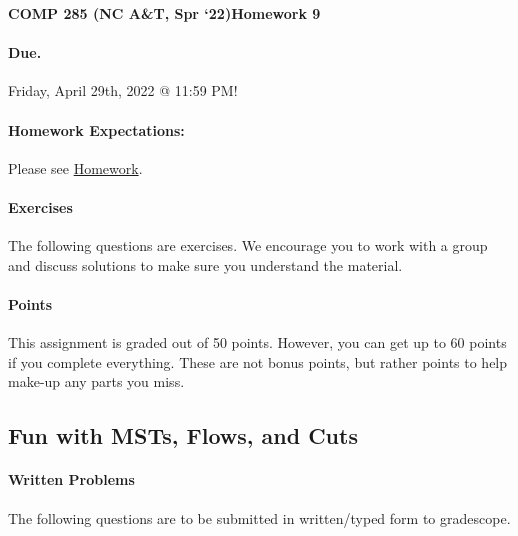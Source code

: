 \documentclass [12pt]{article}
\begin{document}
 

{\LARGE \textbf{COMP 285 (NC A\&T, Spr `22)}\hfill \textbf{Homework 9} } 
\vspace{1em} 
\begin{Instruction} 

\paragraph{Due.} Friday, April 29th, 2022 @ 11:59 PM!
\end{Instruction}

\vspace{1em} 
\begin{Instruction} \paragraph{Homework Expectations:} Please see \href{https://www.comp285.ml/homework/#general-homework-information}{Homework}.
\end{Instruction}

\vspace{1em} 
\begin{Instruction} 

\paragraph{Exercises} The following questions are exercises. We encourage you to work with a group and discuss solutions to make sure you understand the material.

\paragraph{Points} This assignment is graded out of 50 points. However, you can get up to 60 points if you complete everything. These are not bonus points, but rather points to help make-up any parts you miss.

\end{Instruction} 

\begin{centering}
\section*{Fun with MSTs, Flows, and Cuts}
\end{centering}

\begin{Instruction}

\paragraph{Written Problems} The following questions are to be submitted in written/typed form to gradescope.

\end{Instruction}
\end{document}
